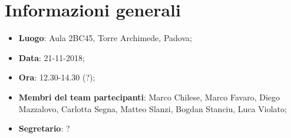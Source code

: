 \section{Informazioni generali}
\begin{itemize}
	\item \textbf{Luogo}: Aula 2BC45, Torre Archimede, Padova;
	\item \textbf{Data}: 21-11-2018;
	\item \textbf{Ora}:	12.30-14.30 (?);
	\item \textbf{Membri del team partecipanti}: Marco Chilese, Marco Favaro, Diego Mazzalovo, Carlotta Segna, Matteo Slanzi, Bogdan Stanciu, Luca Violato;
	\item \textbf{Segretario}: ?
\end{itemize}